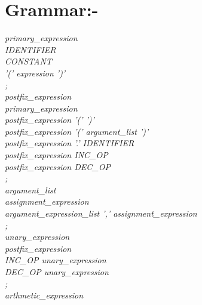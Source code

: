 \documentclass[11pt]{article}
\begin{document}
\section{Grammar:-}
{\itshape
primary\_expression\\
\hspace*{1cm} IDENTIFIER\\
\hspace*{1cm}   CONSTANT\\
\hspace*{1cm}   '(' expression ')'\\
\hspace*{1cm};\\
postfix\_expression\\
\hspace*{1cm} primary\_expression\\
\hspace*{1cm}   postfix\_expression '(' ')'\\
\hspace*{1cm}   postfix\_expression '(' argument\_list ')'\\
\hspace*{1cm}   postfix\_expression '.' IDENTIFIER\\
\hspace*{1cm}   postfix\_expression INC\_OP\\
\hspace*{1cm}   postfix\_expression DEC\_OP\\
\hspace*{1cm};\\
argument\_list\\
\hspace*{1cm} assignment\_expression\\
\hspace*{1cm}   argument\_expression\_list ',' assignment\_expression\\
\hspace*{1cm};\\
unary\_expression\\
\hspace*{1cm} postfix\_expression\\
\hspace*{1cm}   INC\_OP unary\_expression\\
\hspace*{1cm}   DEC\_OP unary\_expression\\
\hspace*{1cm};\\
arthmetic\_expression\\
}
\end{document}
